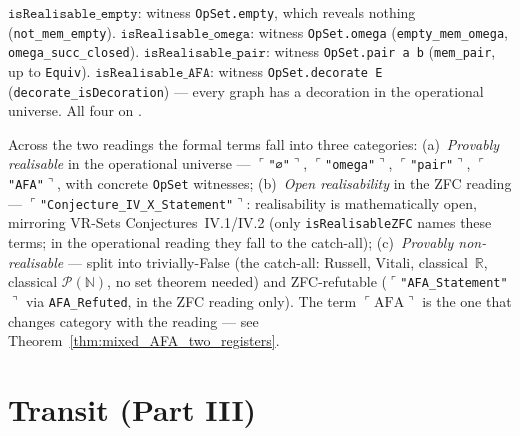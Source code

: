 \begin{theorem}
\label{thm:isRealisable_base}
\leanok
{}
$\texttt{isRealisable\_empty}$: witness \texttt{OpSet.empty}, which reveals
nothing (\texttt{not\_mem\_empty}).
$\texttt{isRealisable\_omega}$: witness \texttt{OpSet.omega}
(\texttt{empty\_mem\_omega}, \texttt{omega\_succ\_closed}).
$\texttt{isRealisable\_pair}$: witness \texttt{OpSet.pair a b}
(\texttt{mem\_pair}, up to \texttt{Equiv}).
$\texttt{isRealisable\_AFA}$: witness \texttt{OpSet.decorate E}
(\texttt{decorate\_isDecoration}) --- every graph has a decoration in the
operational universe.  All four on \axiomprofile{[]}.
\end{theorem}

\begin{remark}
\label{rem:three_category}
\leanok
{}
Across the two readings the formal terms fall into three categories:
(a)~\emph{Provably realisable} in the operational universe ---
$\ulcorner$\texttt{"∅"}$\urcorner$, $\ulcorner$\texttt{"omega"}$\urcorner$,
$\ulcorner$\texttt{"pair"}$\urcorner$, $\ulcorner$\texttt{"AFA"}$\urcorner$,
with concrete \texttt{OpSet} witnesses;
(b)~\emph{Open realisability} in the ZFC reading ---
$\ulcorner$\texttt{"Conjecture\_IV\_X\_Statement"}$\urcorner$: realisability
is mathematically open, mirroring VR-Sets Conjectures~IV.1/IV.2 (only
\texttt{isRealisableZFC} names these terms; in the operational reading they
fall to the catch-all);
(c)~\emph{Provably non-realisable} --- split into trivially-False (the
catch-all: Russell, Vitali, classical~$\mathbb{R}$, classical
$\mathcal{P}(\mathbb{N})$, no set theorem needed) and ZFC-refutable
($\ulcorner$\texttt{"AFA\_Statement"}$\urcorner$ via
\texttt{AFA\_Refuted}, in the ZFC reading only).  The term
$\ulcorner\mathrm{AFA}\urcorner$ is the one that changes category with the
reading --- see Theorem~\ref{thm:mixed_AFA_two_registers}.
\end{remark}

\section{Transit (Part III)}
\label{sec:forms_transit}

